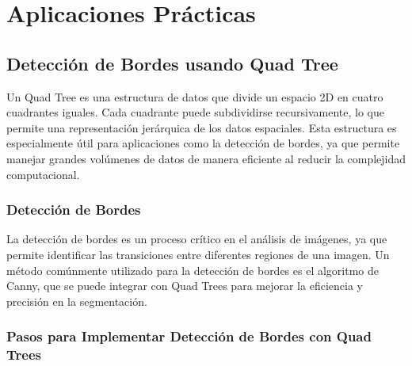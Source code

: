 \documentclass[9pt,a4paper,twoside]{rho-class/rho}
\begin{document}
    \section{Aplicaciones Prácticas}
        \subsection{Detección de Bordes usando Quad Tree}

        Un Quad Tree es una estructura de datos que divide un espacio 2D en cuatro cuadrantes iguales. Cada cuadrante puede subdividirse recursivamente, lo que permite una representación jerárquica de los datos espaciales. Esta estructura es especialmente útil para aplicaciones como la detección de bordes, ya que permite manejar grandes volúmenes de datos de manera eficiente al reducir la complejidad computacional.
        
            \subsubsection{Detección de Bordes}
            
            La detección de bordes es un proceso crítico en el análisis de imágenes, ya que permite identificar las transiciones entre diferentes regiones de una imagen. Un método comúnmente utilizado para la detección de bordes es el algoritmo de Canny, que se puede integrar con Quad Trees para mejorar la eficiencia y precisión en la segmentación.
            
            \subsubsection{Pasos para Implementar Detección de Bordes con Quad Trees}
            
\end{document}
